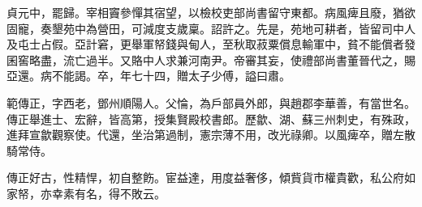 \begin{pinyinscope}
 貞元中，罷歸。宰相竇參憚其宿望，以檢校吏部尚書留守東都。病風痺且廢，猶欲固寵，奏墾苑中為營田，可減度支歲稟。詔許之。先是，苑地可耕者，皆留司中人及屯士占假。亞計窘，更舉軍帑錢與甸人，至秋取菽粟償息輸軍中，貧不能償者發囷窖略盡，流亡過半。又賂中人求兼河南尹。帝審其妄，使禮部尚書董晉代之，賜亞還。病不能謁。卒，年七十四，贈太子少傅，謚曰肅。



 範傳正，字西老，鄧州順陽人。父惀，為戶部員外郎，與趙郡李華善，有當世名。傳正舉進士、宏辭，皆高第，授集賢殿校書郎。歷歙、湖、蘇三州刺史，有殊政，進拜宣歙觀察使。代還，坐治第過制，憲宗薄不用，改光祿卿。以風痺卒，贈左散騎常侍。



 傳正好古，性精悍，初自整飭。宦益達，用度益奢侈，傾貲貨市權貴歡，私公府如家帑，亦幸素有名，得不敗云。



\end{pinyinscope}